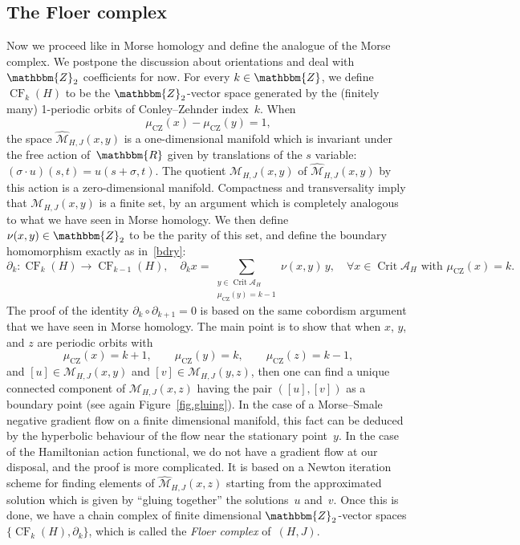 \documentclass[12pt,twoside]{amsart}
\theoremstyle{plain}
\numberwithin{figure}{section}
\numberwithin{equation}{section}
\def\Crit{\operatorname{Crit}}
\def\sCZ{ {\scriptscriptstyle\operatorname{CZ}}}
\def\CF{\operatorname{CF}}
\def\ca{{\mathcal A}}
\def\RR{\mathbbm{R}}
\def\ZZ{\mathbbm{Z}}
\begin{document}
\subsection{The Floer complex} 
Now we proceed like in Morse homology and define the analogue of the Morse complex. 
We postpone the discussion about orientations and deal with $\ZZ_2$ coefficients for now. 
For every $k \in \ZZ$, we define $\CF_k(H)$ to be the $\ZZ_2$-vector space generated by the (finitely many) 
1-periodic orbits of Conley--Zehnder index~$k$. When 
\[
\mu_{\sCZ}(x) - \mu_{\sCZ}(y) = 1,
\]
the space $\widehat{\mathcal{M}}_{H,J}(x,y)$ is a one-dimensional manifold which is invariant under the free action of~$\RR$ given by translations of the $s$ variable: 
$(\sigma \cdot u)(s,t) = u(s+\sigma,t)$. 
The quotient $\mathcal{M}_{H,J}(x,y)$ of $\widehat{\mathcal{M}}_{H,J}(x,y)$ by this action is 
a zero-dimensional manifold. Compactness and transversality imply that $\mathcal{M}_{H,J}(x,y)$ is 
a finite set, by an argument which is completely analogous to what we have seen in Morse homology. 
We then define $\nu(x,y) \in \ZZ_2$ to be the parity of this set, and define the boundary homomorphism exactly as in~\eqref{bdry}:
\[
\partial_k \colon \CF_k(H) \to \CF_{k-1}(H), \quad 
\partial_k x = \sum_{\substack{y \in \Crit \ca_H \\ \mu_{\sCZ}(y)=k-1}} \nu(x,y)\, y, \quad 
\forall x \in \Crit \ca_H \mbox{ with } \mu_{\sCZ}(x)=k.
\]
The proof of the identity $\partial_k \circ \partial_{k+1}=0$ is based on the same cobordism argument 
that we have seen in Morse homology. The main point is to show that when $x$, $y$, and $z$ are periodic orbits with
\[
\mu_{\sCZ}(x)=k+1, \qquad \mu_{\sCZ}(y) = k, \qquad \mu_{\sCZ}(z)=k-1,
\]
and $[u] \in \mathcal{M}_{H,J}(x,y)$ and $[v] \in \mathcal{M}_{H,J}(y,z)$, then one can find a unique connected component of $\mathcal{M}_{H,J}(x,z)$ having the pair $([u],[v])$ as a boundary point 
(see again Figure~\ref{fig.gluing}). In the case of a Morse--Smale negative gradient flow on a finite dimensional manifold, this fact can be deduced by the hyperbolic behaviour of the flow near the 
stationary point~$y$. In the case of the Hamiltonian action functional, we do not have a gradient flow 
at our disposal, and the proof is more complicated. It is based on a Newton iteration scheme for finding elements of $\widehat{\mathcal{M}}_{H,J}(x,z)$ starting from the approximated solution which is given by 
``gluing together'' the solutions~$u$ and~$v$. Once this is done, we have a chain complex of finite dimensional $\ZZ_2$-vector spaces $\{\CF_k(H),\partial_k\}$, 
which is called the {\em Floer complex}\/ of~$(H,J)$.
\end{document}
